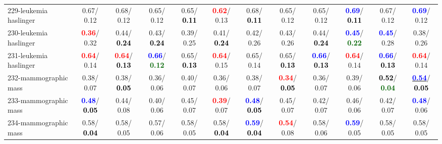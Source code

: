 \begin{table}[h]
\begin{center}
{\begin{tabular}{lc|c|c|c|c|c|c|c|c|c|c}
229-leukemia haslinger &   0.67/  0.12 &   0.68/  0.12 &   0.65/  0.12 &   0.65/\textcolor{black}{\textbf{  0.11}} & \textcolor{red}{\textbf{  0.62}}/  0.13 &   0.68/\textcolor{black}{\textbf{  0.11}} &   0.65/  0.12 &   0.65/  0.12 & \textcolor{blue}{\textbf{  0.69}}/\textcolor{black}{\textbf{  0.11}} &   0.67/  0.12 & \textcolor{blue}{\textbf{  0.69}}/  0.12 \\
230-leukemia haslinger & \textcolor{red}{\textbf{  0.36}}/  0.32 &   0.44/\textcolor{black}{\textbf{  0.24}} &   0.43/\textcolor{black}{\textbf{  0.24}} &   0.39/  0.25 &   0.41/\textcolor{black}{\textbf{  0.24}} &   0.42/  0.26 &   0.43/  0.26 &   0.44/\textcolor{black}{\textbf{  0.24}} & \textcolor{blue}{\textbf{  0.45}}/\textcolor{darkgreen}{\textbf{  0.22}} & \textcolor{blue}{\textbf{  0.45}}/  0.28 &   0.38/  0.26 \\
231-leukemia haslinger & \textcolor{red}{\textbf{  0.64}}/  0.14 & \textcolor{red}{\textbf{  0.64}}/\textcolor{black}{\textbf{  0.13}} & \textcolor{blue}{\textbf{  0.66}}/\textcolor{darkgreen}{\textbf{  0.12}} &   0.65/\textcolor{black}{\textbf{  0.13}} & \textcolor{red}{\textbf{  0.64}}/  0.15 &   0.65/  0.14 &   0.65/\textcolor{black}{\textbf{  0.13}} & \textcolor{blue}{\textbf{  0.66}}/\textcolor{black}{\textbf{  0.13}} & \textcolor{red}{\textbf{  0.64}}/  0.14 & \textcolor{blue}{\textbf{  0.66}}/\textcolor{black}{\textbf{  0.13}} & \textcolor{red}{\textbf{  0.64}}/  0.14 \\ \hline
232-mammographic mass &   0.38/  0.07 &   0.38/\textcolor{black}{\textbf{  0.05}} &   0.36/  0.06 &   0.40/  0.07 &   0.36/  0.06 &   0.38/  0.07 & \textcolor{red}{\textbf{  0.34}}/\textcolor{black}{\textbf{  0.05}} &   0.36/  0.07 &   0.39/  0.06 & \textcolor{black}{\textbf{  0.52}}/\textcolor{darkgreen}{\textbf{  0.04}} & \underline{\textcolor{blue}{\textbf{  0.54}}}/\textcolor{black}{\textbf{  0.05}} \\
233-mammographic mass & \textcolor{blue}{\textbf{  0.48}}/\textcolor{black}{\textbf{  0.05}} &   0.44/  0.08 &   0.40/  0.06 &   0.45/  0.07 & \textcolor{red}{\textbf{  0.39}}/  0.07 & \textcolor{blue}{\textbf{  0.48}}/\textcolor{black}{\textbf{  0.05}} &   0.45/  0.07 &   0.42/  0.07 &   0.46/  0.06 &   0.42/  0.07 & \textcolor{blue}{\textbf{  0.48}}/  0.06 \\
234-mammographic mass &   0.58/\textcolor{black}{\textbf{  0.04}} &   0.58/  0.05 &   0.57/  0.06 &   0.58/  0.05 &   0.58/\textcolor{black}{\textbf{  0.04}} & \textcolor{blue}{\textbf{  0.59}}/\textcolor{black}{\textbf{  0.04}} & \textcolor{red}{\textbf{  0.54}}/  0.08 &   0.58/  0.06 & \textcolor{blue}{\textbf{  0.59}}/  0.05 &   0.58/  0.05 &   0.58/  0.05 \\

\end{tabular}}
\end{center}
\end{table}
